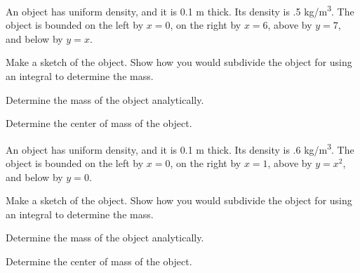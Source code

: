 \begin{problem}

\item An object has uniform density, and it is 0.1 m thick. Its
  density is .5 kg/m\textsuperscript{3}. The object is bounded on the
  left by $x=0$, on the right by $x=6$, above by $y=7$, and below by
  $y=x$.
  \begin{subproblem}
    \item Make a sketch of the object. Show how you would subdivide
      the object for using an integral to determine the mass.
      \vfill
    \item Determine the mass of the object analytically.
      \vfill
    \item Determine the center of mass of the object.
      \vfill
  \end{subproblem}

  \clearpage

\item An object has uniform density, and it is 0.1 m thick. Its
  density is .6 kg/m\textsuperscript{3}. The object is bounded on the
  left by $x=0$, on the right by $x=1$, above by $y=x^2$, and below by
  $y=0$.
  \begin{subproblem}
    \item Make a sketch of the object. Show how you would subdivide
      the object for using an integral to determine the mass.
      \vfill
    \item Determine the mass of the object analytically.
      \vfill
    \item Determine the center of mass of the object.
      \vfill
  \end{subproblem}


\end{problem}

\postClass

